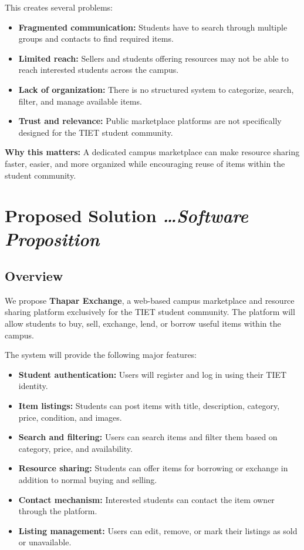 \documentclass[11pt,a4paper]{article}
\newcommand{\BvrHint}[1]{%
  {\normalfont\normalsize\itshape\hfill #1}}
\begin{document}
This creates several problems:
\begin{itemize}[leftmargin=0.7cm]
    \item \textbf{Fragmented communication:} Students have to search through multiple groups and contacts to find required items.
    \item \textbf{Limited reach:} Sellers and students offering resources may not be able to reach interested students across the campus.
    \item \textbf{Lack of organization:} There is no structured system to categorize, search, filter, and manage available items.
    \item \textbf{Trust and relevance:} Public marketplace platforms are not specifically designed for the TIET student community.
\end{itemize}

\textbf{Why this matters:} A dedicated campus marketplace can make resource sharing faster, easier, and more organized while encouraging reuse of items within the student community.

\section{Proposed Solution %
\BvrHint{\ldots Software Proposition}}

\subsection{Overview}
We propose \textbf{Thapar Exchange}, a web-based campus marketplace and resource sharing platform exclusively for the TIET student community. The platform will allow students to buy, sell, exchange, lend, or borrow useful items within the campus.

The system will provide the following major features:
\begin{itemize}[leftmargin=0.7cm]
    \item \textbf{Student authentication:} Users will register and log in using their TIET identity.
    \item \textbf{Item listings:} Students can post items with title, description, category, price, condition, and images.
    \item \textbf{Search and filtering:} Users can search items and filter them based on category, price, and availability.
    \item \textbf{Resource sharing:} Students can offer items for borrowing or exchange in addition to normal buying and selling.
    \item \textbf{Contact mechanism:} Interested students can contact the item owner through the platform.
    \item \textbf{Listing management:} Users can edit, remove, or mark their listings as sold or unavailable.
\end{itemize}
\end{document}
